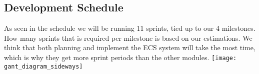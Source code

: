 \subsection{Development Schedule}
As seen in the schedule we will be running 11 sprints, tied up to our 4 milestones.
How many sprints that is required per milestone is based on our estimations. 
We think that both planning and implement the ECS system will take the most time,
which is why they get more sprint periods than the other modules.
\texttt{[image: gant\_diagram\_sideways]}
